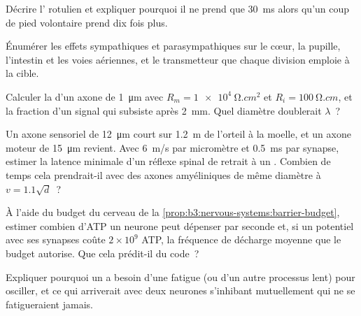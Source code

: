 \begin{exercise}[$\star$]\label{exo:b3:nervous-systems:3}
Décrire l' rotulien et expliquer pourquoi il ne prend que
\qty{30}{ms} alors qu'un coup de pied volontaire prend dix fois plus.
\end{exercise}

\begin{exercise}[$\star$]\label{exo:b3:nervous-systems:4}
Énumérer les effets sympathiques et parasympathiques sur le cœur, la
pupille, l'intestin et les voies aériennes, et le transmetteur que
chaque division emploie à la cible.
\end{exercise}

\begin{exercise}[$\star\star$]\label{exo:b3:nervous-systems:5}
Calculer la  d'un axone de \qty{1}{\micro m} avec $R_{m}
= \qty{1e4}{\ohm.cm^2}$ et $R_{i} = \qty{100}{\ohm.cm}$, et la fraction
d'un signal qui subsiste après \qty{2}{mm}. Quel diamètre doublerait
$\lambda$~?
\end{exercise}

\begin{exercise}[$\star\star$]\label{exo:b3:nervous-systems:6}
Un axone sensoriel de \qty{12}{\micro m} court sur \qty{1.2}{m} de
l'orteil à la moelle, et un axone moteur de \qty{15}{\micro m} revient.
Avec \qty{6}{m/s} par micromètre et \qty{0.5}{ms} par synapse, estimer
la latence minimale d'un réflexe spinal de retrait à un .
Combien de temps cela prendrait-il avec des axones amyéliniques de même
diamètre à $v = 1.1\sqrt{d}$~?
\end{exercise}

\begin{exercise}[$\star\star$]\label{exo:b3:nervous-systems:7}
À l'aide du budget du cerveau de la
\cref{prop:b3:nervous-systems:barrier-budget}, estimer combien d'ATP un
neurone peut dépenser par seconde et, si un potentiel avec ses synapses
coûte $2\times 10^{9}$ ATP, la fréquence de décharge moyenne que le
budget autorise. Que cela prédit-il du code~?
\end{exercise}

\begin{exercise}[$\star\star$]\label{exo:b3:nervous-systems:8}
Expliquer pourquoi un  a besoin d'une fatigue
(ou d'un autre processus lent) pour osciller, et ce qui arriverait avec
deux neurones s'inhibant mutuellement qui ne se fatigueraient jamais.
\end{exercise}

